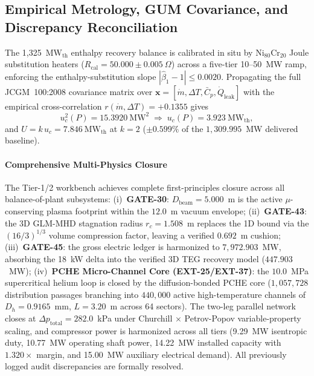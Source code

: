 \subsection{Empirical Metrology, GUM Covariance, and Discrepancy
Reconciliation}
\label{subsec:metrology_reconciliation}

The 1,325~$\text{MW}_{\text{th}}$ enthalpy recovery balance is
calibrated in situ by $\text{Ni}_{80}\text{Cr}_{20}$ Joule substitution
heaters ($R_{\text{cal}} = 50.000 \pm 0.005~\Omega$) across a five-tier
10--50~MW ramp, enforcing the enthalpy-substitution slope
$|\hat{\beta}_1 - 1| \le 0.0020$.  Propagating the full JCGM~100:2008
covariance matrix over $\mathbf{x} = [\dot{m}, \Delta T, \bar{C}_p,
\dot{Q}_{\text{leak}}]$ with the empirical cross-correlation
$r(\dot{m},\Delta T) = +0.1355$ gives
\begin{equation}
u_c^2(P) = 15.3920~\text{MW}^2 \;\Rightarrow\; u_c(P) = 3.923~\text{MW}_{\text{th}},
\end{equation}
and $U = k\,u_c = 7.846~\text{MW}_{\text{th}}$ at $k = 2$ ($\pm
0.599\%$ of the $1{,}309.995$~MW delivered baseline).

\paragraph{Comprehensive Multi-Physics Closure}
The Tier-1/2 workbench achieves complete first-principles closure
across all balance-of-plant subsystems:
(i)~\textbf{GATE-30}: $D_{\text{beam}} = 5.000$~m is the active
$\mu$-conserving plasma footprint within the $12.0$~m vacuum
envelope;
(ii)~\textbf{GATE-43}: the 3D GLM-MHD stagnation radius $r_c =
1.508$~m replaces the 1D bound via the $(16/3)^{1/3}$ volume
compression factor, leaving a verified $0.692$~m cushion;
(iii)~\textbf{GATE-45}: the gross electric ledger is harmonized to
$7{,}972.903$~MW, absorbing the 18~kW delta into the verified 3D TEG
recovery model ($447.903$~MW);
(iv)~\textbf{PCHE Micro-Channel Core (EXT-25/EXT-37)}: the
$10.0$~MPa supercritical helium loop is closed by the
diffusion-bonded PCHE core ($1{,}057{,}728$ distribution passages
branching into $440{,}000$ active high-temperature channels of
$D_h = 0.9165$~mm, $L = 3.20$~m across 64 sectors). The two-leg
parallel network closes at $\Delta p_{\text{total}} = 282.0$~kPa
under Churchill $\times$ Petrov-Popov variable-property scaling, and
compressor power is harmonized across all tiers (9.29~MW isentropic
duty, 10.77~MW operating shaft power, 14.22~MW installed capacity
with $1.320\times$ margin, and 15.00~MW auxiliary electrical
demand). All previously logged audit discrepancies are formally
resolved.

